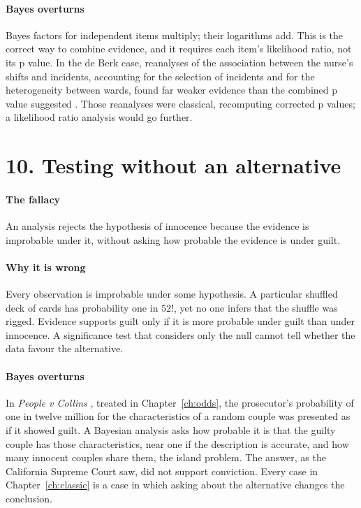 \paragraph{Bayes overturns} Bayes factors for independent items multiply; their logarithms add. This is the correct way to combine evidence, and it requires each item's likelihood ratio, not its p value. In the de Berk case, reanalyses of the association between the nurse's shifts and incidents, accounting for the selection of incidents and for the heterogeneity between wards, found far weaker evidence than the combined p value suggested \citep{meester2006,gill2018}. Those reanalyses were classical, recomputing corrected p values; a likelihood ratio analysis would go further.

\section{10. Testing without an alternative}

\paragraph{The fallacy} An analysis rejects the hypothesis of innocence because the evidence is improbable under it, without asking how probable the evidence is under guilt.

\paragraph{Why it is wrong} Every observation is improbable under some hypothesis. A particular shuffled deck of cards has probability one in $52!$, yet no one infers that the shuffle was rigged. Evidence supports guilt only if it is more probable under guilt than under innocence. A significance test that considers only the null cannot tell whether the data favour the alternative.

\paragraph{Bayes overturns} In \emph{People v Collins} \citep{collins1968}, treated in Chapter~\ref{ch:odds}, the prosecutor's probability of one in twelve million for the characteristics of a random couple was presented as if it showed guilt. A Bayesian analysis asks how probable it is that the guilty couple has those characteristics, near one if the description is accurate, and how many innocent couples share them, the island problem. The answer, as the California Supreme Court saw, did not support conviction. Every case in Chapter~\ref{ch:classic} is a case in which asking about the alternative changes the conclusion.

